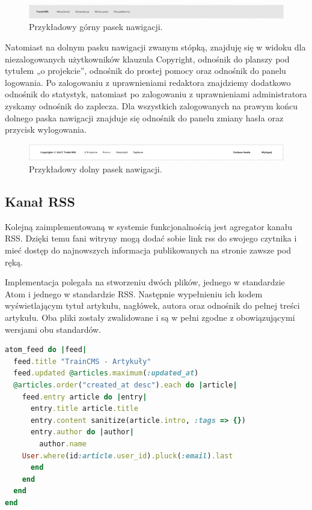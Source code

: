 \documentclass[openright]{xmgr}
\begin{document}
\begin{figure}[!tbh]
\centering
\includegraphics[width=\linewidth]{fig/navbar}
\caption{Przykładowy górny pasek nawigacji.}
\end{figure}

Natomiast na dolnym pasku nawigacji zwanym stópką, znajduję się w widoku dla niezalogowanych użytkowników klauzula Copyright, odnośnik do planszy pod tytułem „o projekcie”, odnośnik do prostej pomocy oraz odnośnik do panelu logowania. Po zalogowaniu z uprawnieniami redaktora znajdziemy dodatkowo odnośnik do statystyk, natomiast po zalogowaniu z uprawnieniami administratora zyskamy odnośnik do zaplecza. Dla wszystkich zalogowanych na prawym końcu dolnego paska nawigacji znajduje się odnośnik do panelu zmiany hasła oraz przycisk wylogowania.

\begin{figure}[!tbh]
\centering
\includegraphics[width=\linewidth]{fig/footbar}
\caption{Przykładowy dolny pasek nawigacji.}
\end{figure}

\newpage

\subsection{Kanał RSS}
Kolejną zaimplementowaną w systemie funkcjonalnością jest agregator kanału RSS. Dzięki temu fani witryny mogą dodać sobie link rss do swojego czytnika i mieć dostęp do najnowszych informacja publikowanych na stronie zawsze pod ręką. 

Implementacja polegała na stworzeniu dwóch plików, jednego w standardzie Atom i jednego w standardzie RSS. Następnie wypełnieniu ich kodem wyświetlającym tytuł artykułu, nagłówek, autora oraz odnośnik do pełnej treści artykułu. Oba pliki zostały zwalidowane i są w pełni zgodne z obowiązującymi wersjami obu standardów.

\begin{lstlisting}[language=ruby, caption={Kod generatora spływu wiadmości w standardzie Atom}]
atom_feed do |feed|
  feed.title "TrainCMS - Artykuły"
  feed.updated @articles.maximum(:updated_at)
  @articles.order("created_at desc").each do |article|
    feed.entry article do |entry|
      entry.title article.title
      entry.content sanitize(article.intro, :tags => {})
      entry.author do |author|
        author.name 
	User.where(id:article.user_id).pluck(:email).last
      end
    end
  end
end
\end{lstlisting} 
\end{document}
